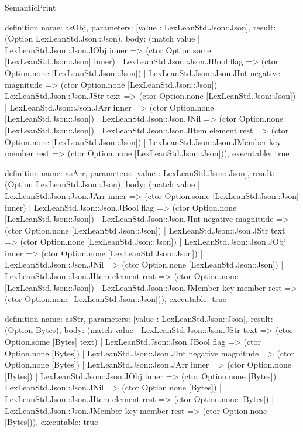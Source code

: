 \begin{lexlean}{SemanticPrint}
\begin{semanticmodule}
definition{
  name: asObj,
  parameters: [value : LexLeanStd.Json::Json],
  result: (Option LexLeanStd.Json::Json),
  body: (match value
    | LexLeanStd.Json::Json.JObj inner => (ctor Option.some [LexLeanStd.Json::Json] inner)
    | LexLeanStd.Json::Json.JBool flag => (ctor Option.none [LexLeanStd.Json::Json])
    | LexLeanStd.Json::Json.JInt negative magnitude => (ctor Option.none [LexLeanStd.Json::Json])
    | LexLeanStd.Json::Json.JStr text => (ctor Option.none [LexLeanStd.Json::Json])
    | LexLeanStd.Json::Json.JArr inner => (ctor Option.none [LexLeanStd.Json::Json])
    | LexLeanStd.Json::Json.JNil => (ctor Option.none [LexLeanStd.Json::Json])
    | LexLeanStd.Json::Json.JItem element rest => (ctor Option.none [LexLeanStd.Json::Json])
    | LexLeanStd.Json::Json.JMember key member rest => (ctor Option.none [LexLeanStd.Json::Json])),
  executable: true
}

definition{
  name: asArr,
  parameters: [value : LexLeanStd.Json::Json],
  result: (Option LexLeanStd.Json::Json),
  body: (match value
    | LexLeanStd.Json::Json.JArr inner => (ctor Option.some [LexLeanStd.Json::Json] inner)
    | LexLeanStd.Json::Json.JBool flag => (ctor Option.none [LexLeanStd.Json::Json])
    | LexLeanStd.Json::Json.JInt negative magnitude => (ctor Option.none [LexLeanStd.Json::Json])
    | LexLeanStd.Json::Json.JStr text => (ctor Option.none [LexLeanStd.Json::Json])
    | LexLeanStd.Json::Json.JObj inner => (ctor Option.none [LexLeanStd.Json::Json])
    | LexLeanStd.Json::Json.JNil => (ctor Option.none [LexLeanStd.Json::Json])
    | LexLeanStd.Json::Json.JItem element rest => (ctor Option.none [LexLeanStd.Json::Json])
    | LexLeanStd.Json::Json.JMember key member rest => (ctor Option.none [LexLeanStd.Json::Json])),
  executable: true
}

definition{
  name: asStr,
  parameters: [value : LexLeanStd.Json::Json],
  result: (Option Bytes),
  body: (match value
    | LexLeanStd.Json::Json.JStr text => (ctor Option.some [Bytes] text)
    | LexLeanStd.Json::Json.JBool flag => (ctor Option.none [Bytes])
    | LexLeanStd.Json::Json.JInt negative magnitude => (ctor Option.none [Bytes])
    | LexLeanStd.Json::Json.JArr inner => (ctor Option.none [Bytes])
    | LexLeanStd.Json::Json.JObj inner => (ctor Option.none [Bytes])
    | LexLeanStd.Json::Json.JNil => (ctor Option.none [Bytes])
    | LexLeanStd.Json::Json.JItem element rest => (ctor Option.none [Bytes])
    | LexLeanStd.Json::Json.JMember key member rest => (ctor Option.none [Bytes])),
  executable: true
}


\end{semanticmodule}
\end{lexlean}
